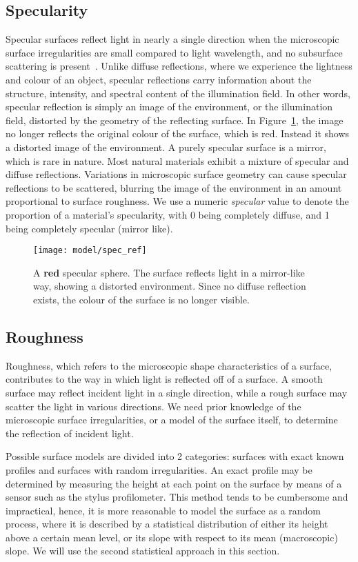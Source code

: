 \subsection{Specularity}
Specular surfaces reflect light in nearly a single direction when the microscopic surface irregularities are small compared to light wavelength, and no subsurface scattering is present~\cite{nayar1989surface}. Unlike diffuse reflections, where we experience the lightness and colour of an object, specular reflections carry information about the structure, intensity, and spectral content of the illumination field. In other words, specular reflection is simply an image of the environment, or the illumination field, distorted by the geometry of the reflecting surface. In Figure~\ref{fig:spec_ref}, the image no longer reflects the original colour of the surface, which is red. Instead it shows a distorted image of the environment. A purely specular surface is a mirror, which is rare in nature. Most natural materials exhibit a mixture of specular and diffuse reflections. Variations in microscopic surface geometry can cause specular reflections to be scattered, blurring the image of the environment in an amount proportional to surface roughness. We use a numeric \textit{specular} value to denote the proportion of a material's specularity, with 0 being completely diffuse, and 1 being completely specular (mirror like).
\begin{figure}[!htbp]
\centering
\texttt{[image: model/spec\_ref]}
\caption{A \textbf{red} specular sphere. The surface reflects light in a mirror-like way, showing a distorted environment. Since no diffuse reflection exists, the colour of the surface is no longer visible.}
\label{fig:spec_ref}
\end{figure}

\subsection{Roughness}
Roughness, which refers to the microscopic shape characteristics of a surface, contributes to the way in which light is reflected off of a surface. A smooth surface may reflect incident light in a single direction, while a rough surface may scatter the light in various directions. We need prior knowledge of the microscopic surface irregularities, or a model of the surface itself, to determine the reflection of incident light.

Possible surface models are divided into 2 categories: surfaces with exact known profiles and surfaces with random irregularities. An exact profile may be determined by measuring the height at each point on the surface by means of a sensor such as the stylus profilometer. This method tends to be cumbersome and impractical, hence, it is more reasonable to model the surface as a random process, where it is described by a statistical distribution of either its height above a certain mean level, or its slope with respect to its mean (macroscopic) slope. We will use the second statistical approach in this section.

